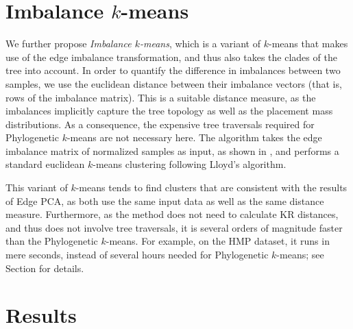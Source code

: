 \section{Imbalance \texorpdfstring{$k$-means}{k-means}}
\label{ch:Clustering:sec:ImbalanceKmeans}

We further propose \emph{Imbalance $k$-means},
which is a variant of $k$-means that makes use of the edge imbalance transformation,
and thus also takes the clades of the tree into account.
In order to quantify the difference in imbalances between two samples,
we use the euclidean distance between their imbalance vectors (that is, rows of the imbalance matrix).
This is a suitable distance measure,
as the imbalances implicitly capture the tree topology as well as the placement mass distributions.
As a consequence, the expensive tree traversals required for Phylogenetic $k$-means are not necessary here.
The algorithm takes the edge imbalance matrix of normalized samples as input,
as shown in ,
and performs a standard euclidean $k$-means clustering following Lloyd's algorithm.

This variant of $k$-means tends to find clusters that are consistent with the results of Edge PCA,
as both use the same input data as well as the same distance measure.
Furthermore, as the method does not need to calculate KR distances,
and thus does not involve tree traversals,
it is several orders of magnitude faster than the Phylogenetic $k$-means.
For example, on the \ac{HMP} dataset, it runs in mere seconds, instead of several hours needed for Phylogenetic $k$-means;
see Section  for details.


\section{Results}
\label{ch:Clustering:sec:Results}

